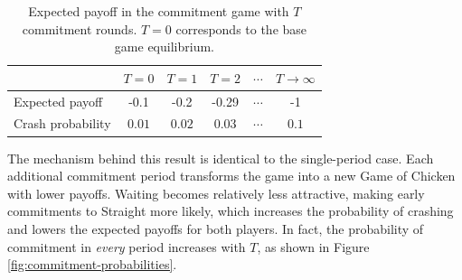\documentclass[letterpaper]{article}
\newcommand{\baseMixPayoff}{-0.1}
\newcommand{\TonePayoff}{-0.2}
\newcommand{\TtwoPayoff}{-0.29}
\newcommand{\TinfPayoff}{-1}
\newcommand{\TinfCrashProbability}{0.1}
\newcommand{\baseProbCrash}{0.01}
\newcommand{\ToneProbCrash}{0.02}
\newcommand{\TtwoProbCrash}{0.03}
\theoremstyle{definition}
\begin{document}
\begin{table}[h]
    \centering
    {\small
    \setlength{\tabcolsep}{3pt}
    \begin{tabular}{@{}lccccc@{}}
        \toprule
        & $T = 0$ & $T = 1$ & $T = 2$ & $\cdots$ & $T \to \infty$ \\
        \midrule
        Expected payoff & \baseMixPayoff & \TonePayoff & \TtwoPayoff & $\cdots$ & \TinfPayoff \\ [1ex]
        Crash probability & $\baseProbCrash$ & $\ToneProbCrash$ & $\TtwoProbCrash$ & $\cdots$ & $\TinfCrashProbability$ \\
        \bottomrule
    \end{tabular}
    }
    \caption{Expected payoff in the commitment game with $T$ commitment rounds. $T=0$ corresponds to the base game equilibrium.}
    \label{tab:multiple-commitment-periods-chicken}
\end{table}

The mechanism behind this result is identical to the single-period case. Each additional commitment period transforms the game into a new Game of Chicken with lower payoffs. Waiting becomes relatively less attractive, making early commitments to Straight more likely, which increases the probability of crashing and lowers the expected payoffs for both players. In fact, the probability of commitment in \textit{every} period increases with $T$, as shown in Figure \ref{fig:commitment-probabilities}.
\end{document}
